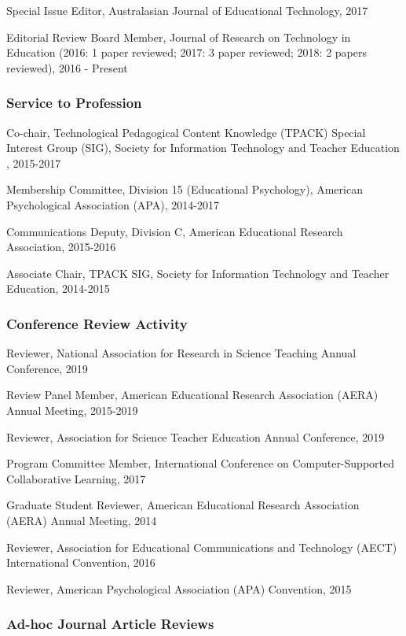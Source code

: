 \documentclass[]{article}
\begin{document}
Special Issue Editor, Australasian Journal of Educational Technology,
2017

Editorial Review Board Member, Journal of Research on Technology in
Education (2016: 1 paper reviewed; 2017: 3 paper reviewed; 2018: 2
papers reviewed), 2016 - Present

\subsubsection{Service to Profession}\label{service-to-profession}

Co-chair, Technological Pedagogical Content Knowledge (TPACK) Special
Interest Group (SIG), Society for Information Technology and Teacher
Education , 2015-2017

Membership Committee, Division 15 (Educational Psychology), American
Psychological Association (APA), 2014-2017

Communications Deputy, Division C, American Educational Research
Association, 2015-2016

Associate Chair, TPACK SIG, Society for Information Technology and
Teacher Education, 2014-2015

\subsubsection{Conference Review
Activity}\label{conference-review-activity}

Reviewer, National Association for Research in Science Teaching Annual
Conference, 2019

Review Panel Member, American Educational Research Association (AERA)
Annual Meeting, 2015-2019

Reviewer, Association for Science Teacher Education Annual Conference,
2019

Program Committee Member, International Conference on Computer-Supported
Collaborative Learning, 2017

Graduate Student Reviewer, American Educational Research Association
(AERA) Annual Meeting, 2014

Reviewer, Association for Educational Communications and Technology
(AECT) International Convention, 2016

Reviewer, American Psychological Association (APA) Convention, 2015

\subsubsection{Ad-hoc Journal Article
Reviews}\label{ad-hoc-journal-article-reviews}
\end{document}

